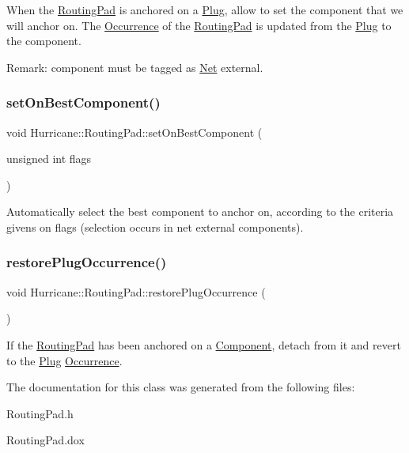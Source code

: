 When the \hyperlink{classHurricane_1_1RoutingPad}{Routing\+Pad} is anchored on a \hyperlink{classHurricane_1_1Plug}{Plug}, allow to set the {\ttfamily component} that we will anchor on. The \hyperlink{classHurricane_1_1Occurrence}{Occurrence} of the \hyperlink{classHurricane_1_1RoutingPad}{Routing\+Pad} is updated from the \hyperlink{classHurricane_1_1Plug}{Plug} to the {\ttfamily component}.

\begin{DoxyParagraph}{Remark\+:}
{\ttfamily component} must be tagged as \hyperlink{classHurricane_1_1Net}{Net} external. 
\end{DoxyParagraph}
\mbox{\label{classHurricane_1_1RoutingPad_a410992ef75c40f9a898c36f39a7d1a1a}} 
\subsubsection{\texorpdfstring{set\+On\+Best\+Component()}{setOnBestComponent()}}
{\footnotesize\ttfamily void Hurricane\+::\+Routing\+Pad\+::set\+On\+Best\+Component (\begin{DoxyParamCaption}\item[{unsigned int}]{flags }\end{DoxyParamCaption})}

Automatically select the best component to anchor on, according to the criteria givens on {\ttfamily flags} (selection occurs in net external components). \mbox{\label{classHurricane_1_1RoutingPad_a1fcb0951f5f9505c6978bf498f78fce9}} 
\subsubsection{\texorpdfstring{restore\+Plug\+Occurrence()}{restorePlugOccurrence()}}
{\footnotesize\ttfamily void Hurricane\+::\+Routing\+Pad\+::restore\+Plug\+Occurrence (\begin{DoxyParamCaption}{ }\end{DoxyParamCaption})}

If the \hyperlink{classHurricane_1_1RoutingPad}{Routing\+Pad} has been anchored on a \hyperlink{classHurricane_1_1Component}{Component}, detach from it and revert to the \hyperlink{classHurricane_1_1Plug}{Plug} \hyperlink{classHurricane_1_1Occurrence}{Occurrence}. 

The documentation for this class was generated from the following files\+:\begin{DoxyCompactItemize}
\item 
Routing\+Pad.\+h\item 
Routing\+Pad.\+dox\end{DoxyCompactItemize}
